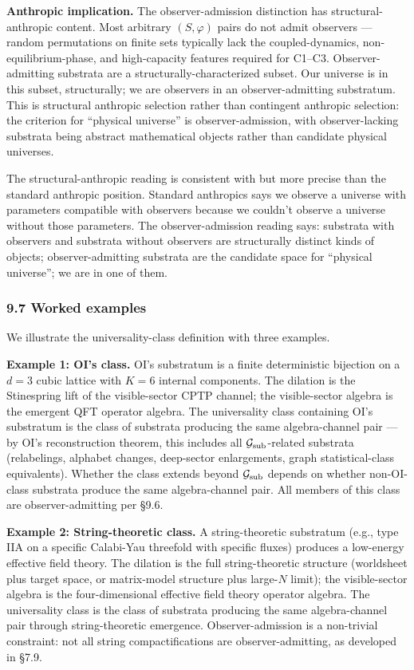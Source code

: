 \documentclass[
]{article}
\begin{document}
\textbf{Anthropic implication.} The observer-admission distinction has
structural-anthropic content. Most arbitrary \((S, \varphi)\) pairs do
not admit observers --- random permutations on finite sets typically
lack the coupled-dynamics, non-equilibrium-phase, and high-capacity
features required for C1--C3. Observer-admitting substrata are a
structurally-characterized subset. Our universe is in this subset,
structurally; we are observers in an observer-admitting substratum. This
is structural anthropic selection rather than contingent anthropic
selection: the criterion for ``physical universe'' is
observer-admission, with observer-lacking substrata being abstract
mathematical objects rather than candidate physical universes.

The structural-anthropic reading is consistent with but more precise
than the standard anthropic position. Standard anthropics says we
observe a universe with parameters compatible with observers because we
couldn't observe a universe without those parameters. The
observer-admission reading says: substrata with observers and substrata
without observers are structurally distinct kinds of objects;
observer-admitting substrata are the candidate space for ``physical
universe''; we are in one of them.

\hypertarget{worked-examples}{%
\subsubsection{9.7 Worked examples}\label{worked-examples}}

We illustrate the universality-class definition with three examples.

\textbf{Example 1: OI's class.} OI's substratum is a finite
deterministic bijection on a \(d=3\) cubic lattice with \(K=6\) internal
components. The dilation is the Stinespring lift of the visible-sector
CPTP channel; the visible-sector algebra is the emergent QFT operator
algebra. The universality class containing OI's substratum is the class
of substrata producing the same algebra-channel pair --- by OI's
reconstruction theorem, this includes all
\(\mathcal{G}_{\rm sub}\)-related substrata (relabelings, alphabet
changes, deep-sector enlargements, graph statistical-class equivalents).
Whether the class extends beyond \(\mathcal{G}_{\rm sub}\) depends on
whether non-OI-class substrata produce the same algebra-channel pair.
All members of this class are observer-admitting per §9.6.

\textbf{Example 2: String-theoretic class.} A string-theoretic
substratum (e.g., type IIA on a specific Calabi-Yau threefold with
specific fluxes) produces a low-energy effective field theory. The
dilation is the full string-theoretic structure (worldsheet plus target
space, or matrix-model structure plus large-\(N\) limit); the
visible-sector algebra is the four-dimensional effective field theory
operator algebra. The universality class is the class of substrata
producing the same algebra-channel pair through string-theoretic
emergence. Observer-admission is a non-trivial constraint: not all
string compactifications are observer-admitting, as developed in §7.9.
\end{document}
